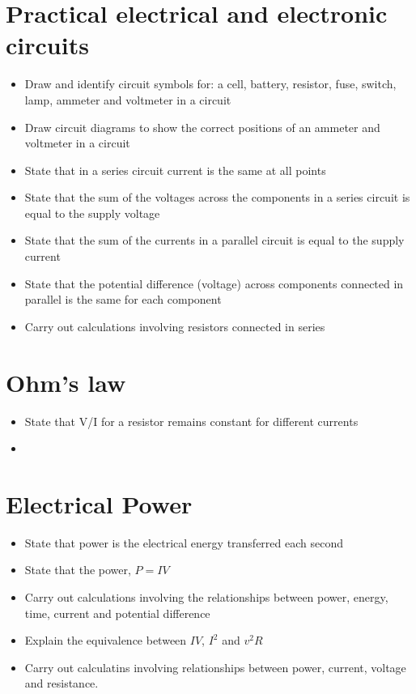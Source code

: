 \section{Practical electrical and electronic circuits}
\begin{multicols}{2}
	\begin{itemize}
		\item Draw and identify circuit symbols for: a cell, battery, resistor, fuse, switch, lamp, ammeter and voltmeter in a circuit
		\item Draw circuit diagrams to show the correct positions of an ammeter and voltmeter in a circuit
		\item State that in a series circuit current is the same at all points
		\item State that the sum of the voltages across the components in a series circuit is equal to the supply voltage
		\item State that the sum of the currents in a parallel circuit is equal to the supply current
		\item State that the potential difference (voltage) across components connected in parallel is the same for each component
		\item Carry out calculations involving resistors connected in series 
	\end{itemize}
\end{multicols}

\section{Ohm's law}
\begin{multicols}{2}
	\begin{itemize}
		\item State that V/I for a resistor remains constant for different currents
		\item 
	\end{itemize}
\end{multicols}

\section{Electrical Power}
\begin{multicols}{2}
	\begin{itemize}
		\item State that power is the electrical energy transferred each second
		\item State that the power, $P = IV$
		\item Carry out calculations involving the relationships between power,
			energy, time, current and potential difference
		\item Explain the equivalence between $IV$, $I^2$ and $v^2 R$
		\item Carry out calculatins involving relationships between power, current,
			voltage and resistance.
	\end{itemize}
\end{multicols}

